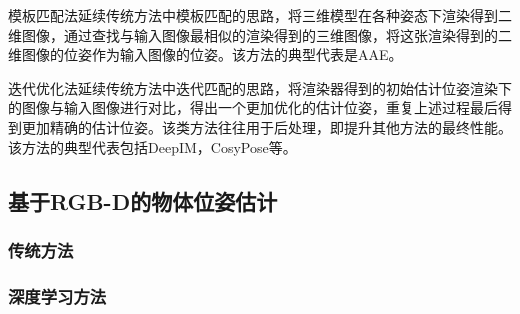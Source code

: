 \par 模板匹配法延续传统方法中模板匹配的思路，将三维模型在各种姿态下渲染得到二维图像，通过查找与输入图像最相似的渲染得到的三维图像，将这张渲染得到的二维图像的位姿作为输入图像的位姿。该方法的典型代表是AAE\cite{sundermeyer2018implicit}。
\par 迭代优化法延续传统方法中迭代匹配的思路，将渲染器得到的初始估计位姿渲染下的图像与输入图像进行对比，得出一个更加优化的估计位姿，重复上述过程最后得到更加精确的估计位姿。该类方法往往用于后处理，即提升其他方法的最终性能。该方法的典型代表包括DeepIM\cite{li2018deepim}，CosyPose\cite{labbe2020cosypose}等。

\subsection{基于RGB-D的物体位姿估计}

\subsubsection{传统方法}

\subsubsection{深度学习方法}

